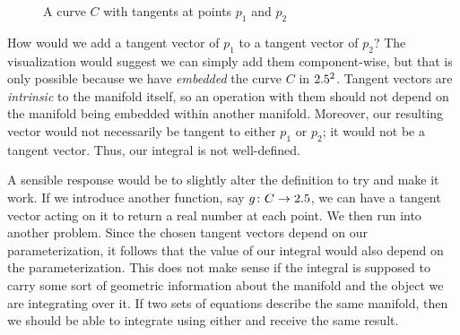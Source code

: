 \documentclass[a4paper,12pt]{article}
\begin{document}
\begin{figure}[!htbp]
\centering
{}
\caption{A curve $C$ with tangents at points $p_1$ and $p_2$}
\label{fig:curve_tangents}
\end{figure}

How would we add a tangent vector of $p_1$ to a tangent vector of $p_2$?
The visualization would suggest we can simply add them component-wise, but that is only possible because we have \emph{embedded} the curve $C$ in $2.5^2$.
Tangent vectors are \emph{intrinsic} to the manifold itself, so an operation with them should not depend on the manifold being embedded within another manifold.
Moreover, our resulting vector would not necessarily be tangent to either $p_1$ or $p_2$; it would not be a tangent vector.
Thus, our integral is not well-defined.

A sensible response would be to slightly alter the definition to try and make it work.
If we introduce another function, say $g \colon C \to 2.5$, we can have a tangent vector acting on it to return a real number at each point.
We then run into another problem.
Since the chosen tangent vectors depend on our parameterization, it follows that the value of our integral would also depend on the parameterization.
This does not make sense if the integral is supposed to carry some sort of geometric information about the manifold and the object we are integrating over it.
If two sets of equations describe the same manifold, then we should be able to integrate using either and receive the same result.
\end{document}
